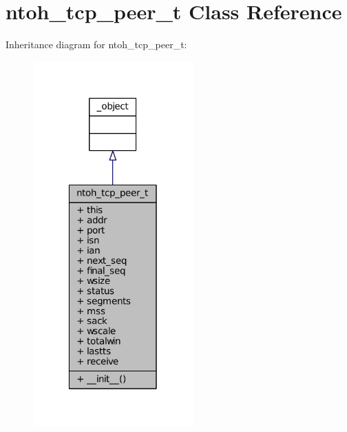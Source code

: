 \hypertarget{classlibntoh_1_1ntoh__tcp__peer__t}{\section{ntoh\-\_\-tcp\-\_\-peer\-\_\-t Class Reference}
\label{classlibntoh_1_1ntoh__tcp__peer__t}
}


Inheritance diagram for ntoh\-\_\-tcp\-\_\-peer\-\_\-t\-:
\nopagebreak
\begin{figure}[H]
\begin{center}
\leavevmode
\includegraphics[width=174pt]{classlibntoh_1_1ntoh__tcp__peer__t__inherit__graph}
\end{center}
\end{figure}


